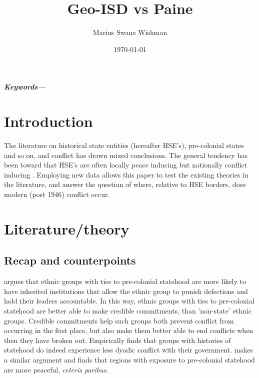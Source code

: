\documentclass[12pt]{article}
\title{Geo-ISD vs Paine}
\author[1]{Marius Swane Wishman}
\affil[1]{Department of Sociology and Political Science, NTNU}
\date{\today}
\providecommand{\keywords}[1]
{
	\small	
	\textbf{\textit{Keywords---}} #1
}
\begin{document}
\maketitle

\begin{abstract}
\end{abstract}

\keywords{}

\pagebreak


\onehalfspacing

\section{Introduction}

The literature on historical state entities (hereafter HSE's), pre-colonial states and so on, and conflict has drawn mixed conclusions.
The general tendency has been toward that HSE's are often locally peace inducing \citep{Wig2016, Wig2018} but nationally conflict inducing \citep{Paine2019}.
Employing new data allows this paper to test the existing theories in the literature, and answer the question of where, relative to HSE borders, does modern (post 1946) conflict occur.

\section{Literature/theory}

\subsection{Recap \citet{Wig2016} and counterpoints}
\citet{Wig2016} argues that ethnic groups with ties to pre-colonial statehood are more likely to have inherited institutions that allow the ethnic group to punish defections and hold their leaders accountable.
In this way, ethnic groups with ties to pre-colonial statehood are better able to make credible commitments, than 'non-state' ethnic groups.
Credible commitments help such groups both prevent conflict from occurring in the first place, but also make them better able to end conflicts when then they have broken out.
Empirically \citet{Wig2016} finds that groups with histories of statehood do indeed experience less dyadic conflict with their government.
\citet{Depetris-Chauvin2016} makes a similar argument and finds that regions with exposure to pre-colonial statehood are more peaceful, \emph{ceteris paribus}.
\end{document}
